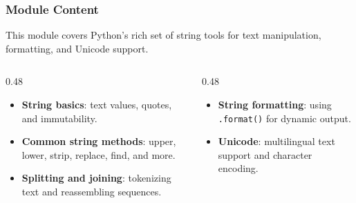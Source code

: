 \documentclass[aspectratio=169,10pt]{beamer}
\newcommand{\keyword}[1]{\textcolor{PrimaryBlue}{\textbf{#1}}}
\newcommand{\codeword}[1]{\texttt{#1}}
\begin{document}
\begin{frame}
\frametitle{Module Content}
\small
This module covers Python's rich set of string tools for text manipulation, formatting, and Unicode support.

\vspace{0.16cm}
\begin{columns}[T,totalwidth=0.96\textwidth]
\begin{column}{0.48\textwidth}
\begin{itemize}\setlength\itemsep{0.08cm}
  \item \keyword{String basics}: text values, quotes, and immutability.
  \item \keyword{Common string methods}: upper, lower, strip, replace, find, and more.
  \item \keyword{Splitting and joining}: tokenizing text and reassembling sequences.
\end{itemize}
\end{column}
\begin{column}{0.48\textwidth}
\begin{itemize}\setlength\itemsep{0.08cm}
  \item \keyword{String formatting}: using \codeword{.format()} for dynamic output.
  \item \keyword{Unicode}: multilingual text support and character encoding.
\end{itemize}
\end{column}
\end{columns}
\end{frame}
\end{document}
